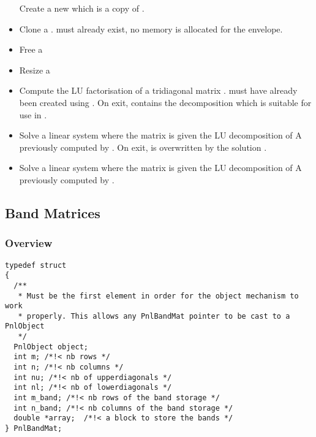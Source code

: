 \begin{itemize}
    \sshortdescribe Create a new  which is a copy of
    .
  \item {}
    \sshortdescribe Clone a .  must
    already exist, no memory is allocated for the envelope. 
  \item {}
    \sshortdescribe Free a 
  \item {}
    \sshortdescribe Resize a 
  \item {}
    \sshortdescribe Compute the LU factorisation of a tridiagonal matrix
    .  must have already been created using
    . On exit,  contains the
    decomposition which is suitable for use in .
  \item {}
    \sshortdescribe Solve a linear system  where the matrix 
    is given the LU decomposition of A previously computed by
    . On exit,  is overwritten by the
    solution . 
  \item {}
    \sshortdescribe Solve a linear system  where the matrix 
    is given the LU decomposition of A previously computed by
    . 
\end{itemize}



\subsection{Band Matrices}
\subsubsection{Overview}

\begin{verbatim}
typedef struct
{
  /**
   * Must be the first element in order for the object mechanism to work
   * properly. This allows any PnlBandMat pointer to be cast to a PnlObject
   */
  PnlObject object; 
  int m; /*!< nb rows */ 
  int n; /*!< nb columns */ 
  int nu; /*!< nb of upperdiagonals */
  int nl; /*!< nb of lowerdiagonals */
  int m_band; /*!< nb rows of the band storage */
  int n_band; /*!< nb columns of the band storage */
  double *array;  /*!< a block to store the bands */  
} PnlBandMat;
\end{verbatim}


